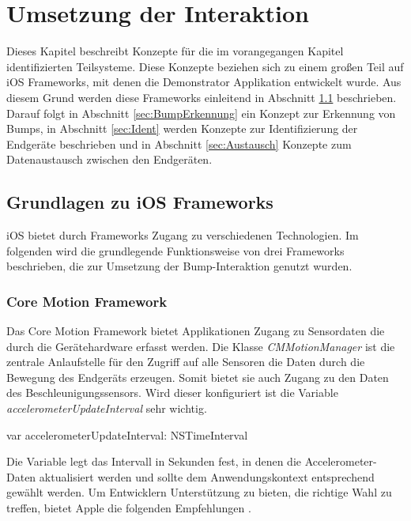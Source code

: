 \chapter{Umsetzung der Interaktion}
\label{Kap4}
\label{chap:Kap4}
Dieses Kapitel beschreibt Konzepte für die im vorangegangen Kapitel identifizierten Teilsysteme. Diese Konzepte beziehen sich zu einem großen Teil auf \acs{iOS} Frameworks, mit denen die Demonstrator Applikation entwickelt wurde. Aus diesem Grund werden diese Frameworks einleitend in Abschnitt \ref{sec:iOSFrameworks} beschrieben. Darauf folgt in Abschnitt \ref{sec:BumpErkennung} ein Konzept zur Erkennung von Bumps, in Abschnitt \ref{sec:Ident} werden Konzepte zur Identifizierung der Endgeräte beschrieben und in Abschnitt \ref{sec:Austausch} Konzepte zum Datenaustausch zwischen den Endgeräten.

\section{Grundlagen zu iOS Frameworks}
\label{sec:iOSFrameworks}
\acs{iOS} bietet durch Frameworks Zugang zu verschiedenen Technologien. Im folgenden wird die grundlegende Funktionsweise von drei Frameworks beschrieben, die zur Umsetzung der Bump-Interaktion genutzt wurden.

\subsection{Core Motion Framework}
\label{subsec:coreMotion}
Das Core Motion Framework bietet Applikationen Zugang zu Sensordaten die durch die Gerätehardware erfasst werden. Die Klasse \textit{CMMotionManager} ist die zentrale Anlaufstelle für den Zugriff auf alle Sensoren die Daten durch die Bewegung des Endgeräts erzeugen. Somit bietet sie auch Zugang zu den Daten des Beschleunigungssensors. Wird dieser konfiguriert ist die Variable \textit{accelerometerUpdateInterval} sehr wichtig.  

\begin{description}
  \item \textcolor{type}{var} \noindent\hspace*{1mm} accelerometerUpdateInterval: \textcolor{parameter}{NSTimeInterval}
        \\[2mm]
\end{description}

Die Variable legt das Intervall in Sekunden fest, in denen die Accelerometer-Daten aktualisiert werden und sollte dem Anwendungskontext entsprechend gewählt werden. Um Entwicklern Unterstützung zu bieten, die richtige Wahl zu treffen, bietet Apple die folgenden Empfehlungen \cite{AppleAccelerometer:Online}.

